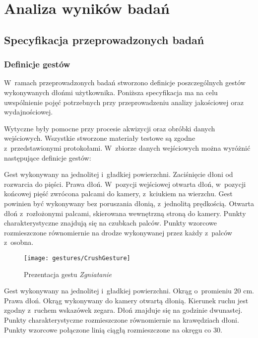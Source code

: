\chapter{Analiza wyników badań}\label{Chapter_AnalizaRezultatow}

  \section{Specyfikacja przeprowadzonych badań}\label{Section_SpecyfikacjaPrzeprowadzonychBadan}

    \subsection{Definicje gestów}\label{Subsection_DefinicjeGestow}

      W~ramach przeprowadzonych badań stworzono definicje poszczególnych gestów wykonywanych dłońmi użytkownika. Poniższa specyfikacja ma na celu uwspólnienie pojęć potrzebnych przy przeprowadzeniu analizy jakościowej oraz wydajnościowej.

      Wytyczne były pomocne przy procesie akwizycji oraz obróbki danych wejściowych. Wszystkie stworzone materiały testowe są zgodne z~przedstawionymi protokołami. W~zbiorze danych wejściowych można wyróżnić następujące definicje gestów:

             {Gest wykonywany na jednolitej i~gładkiej powierzchni.}
             {Zaciśnięcie dłoni od rozwarcia do pięści.}
             {Prawa dłoń.}
             {W~pozycji wejściowej otwarta dłoń, w~pozycji końcowej pięść zwrócona palcami do kamery, z~kciukiem na wierzchu.}
             {Gest powinien być wykonywany bez poruszania dłonią, z~jednolitą prędkością.}
             {Otwarta dłoń z~rozłożonymi palcami, skierowana wewnętrzną stroną do kamery.}
             {Punkty charakterystyczne znajdują się na czubkach palców.}
             {Punkty wzorcowe rozmieszczone równomiernie na drodze wykonywanej przez każdy z~palców z~osobna.}

        \begin{figure}[!ht]
          \centering
          \texttt{[image: gestures/CrushGesture]}
          \caption[Prezentacja gestu Zgniatanie]
                  {Prezentacja gestu \textit{Zgniatanie}}
          \label{fig:CrushGesture}
        \end{figure}

      \newpage
             {Gest wykonywany na jednolitej i~gładkiej powierzchni.}
             {Okrąg o~promieniu 20 cm.}
             {Prawa dłoń.}
             {Okrąg wykonywany do kamery otwartą dłonią.}
             {Kierunek ruchu jest zgodny z~ruchem wskazówek zegara.}
             {Dłoń znajduje się na godzinie dwunastej.}
             {Punkty charakterystyczne rozmieszczone równomiernie na krawędziach dłoni.}
             {Punkty wzorcowe połączone linią ciągłą rozmieszczone na okręgu co 30\degree.}

